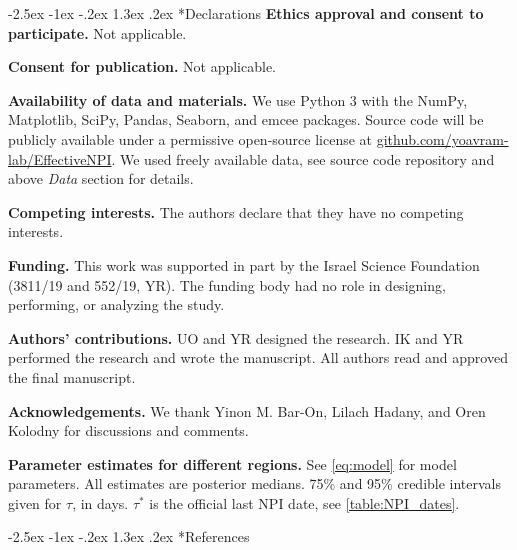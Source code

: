 \documentclass[12pt]{extarticle}
\makeatletter
\renewcommand\section{\@startsection {section}{1}{\z@}%
     {-2.5ex \@plus -1ex \@minus -.2ex}%
     {1.3ex \@plus.2ex}%
    {\Large\bfseries}}
\makeatother
\begin{document}
{\small
\section*{Declarations}
\textbf{Ethics approval and consent to participate.} Not applicable.

\textbf{Consent for publication.} Not applicable.

\textbf{Availability of data and materials.} We use Python 3 with the NumPy, Matplotlib, SciPy, Pandas, Seaborn, and emcee packages.
Source code will be publicly available under a permissive open-source license at \href{http://github.com/yoavram-lab/EffectiveNPI}{github.com/yoavram-lab/EffectiveNPI}.
We used freely available data, see source code repository and above \emph{Data} section for details.

\textbf{Competing interests.} The authors declare that they have no competing interests.

\textbf{Funding.} This work was supported in part by the Israel Science Foundation (3811/19 and 552/19, YR). The funding body had no role in designing, performing, or analyzing the study.

\textbf{Authors' contributions.} UO and YR designed the research. IK and YR performed the research and wrote the manuscript. All authors read and approved the final manuscript.

\textbf{Acknowledgements.} 
We thank Yinon M. Bar-On, Lilach Hadany, and Oren Kolodny for discussions and comments. %
} %

\begin{landscape}
\begin{table}[]
\centering

\caption{
\textbf{Parameter estimates for different regions.}
See \autoref{eq:model} for model parameters.
All estimates are posterior medians.
75\% and 95\% credible intervals given for $\tau$, in days.
$\tau^*$ is the official last NPI date, see \autoref{table:NPI_dates}.
}
\label{table:estimated-params}
\end{table}
\end{landscape}




\section*{References}
\nolinenumbers

%

\end{document}
